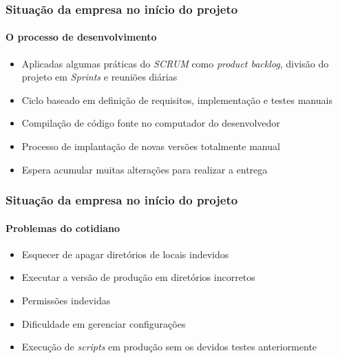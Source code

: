 \documentclass[aspectratio=169]{beamer}
\begin{document}
\begin{frame}
	
	\frametitle{Situação da empresa no início do projeto}
	\framesubtitle{O processo de desenvolvimento}
	
	\begin{itemize}
		
		\item Aplicadas algumas práticas do \textit{SCRUM} como \textit{product backlog}, divisão do projeto em \textit{Sprints} e reuniões diárias
		
		\item Ciclo baseado em definição de requisitos, implementação e testes manuais
		
		\item Compilação de código fonte no computador do desenvolvedor
		
		\item Processo de implantação de novas versões totalmente manual
		
		\item Espera acumular muitas alterações para realizar a entrega
	\end{itemize}
	
\end{frame}


\begin{frame}
	
	\frametitle{Situação da empresa no início do projeto}
	\framesubtitle{Problemas do cotidiano}
	
	\begin{itemize}
		
		\item Esquecer de apagar diretórios de locais indevidos
		
		\item Executar a versão de produção em diretórios incorretos
		
		\item Permissões indevidas
		
		\item Dificuldade em gerenciar configurações
		
		\item Execução de \textit{scripts} em produção sem os devidos testes anteriormente
	\end{itemize}
	
\end{frame}
\end{document}
